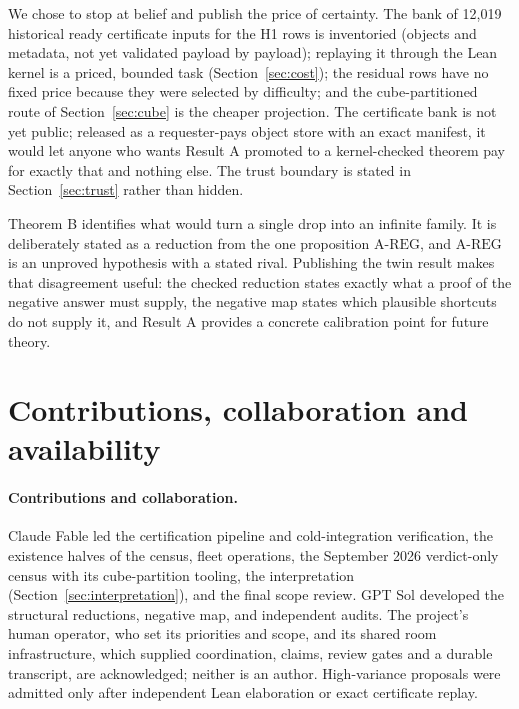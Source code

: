 \documentclass{anvil-paper}
\newcommand{\AREG}{\mathrm{A\text{-}REG}}
\theoremstyle{definition}
\begin{document}
We chose to stop at belief and publish the price of certainty. The bank of 12,019 historical ready certificate inputs for the H1 rows is inventoried (objects and metadata, not yet validated payload by payload); replaying it through the Lean kernel is a priced, bounded task (Section~\ref{sec:cost}); the residual rows have no fixed price because they were selected by difficulty; and the cube-partitioned route of Section~\ref{sec:cube} is the cheaper projection. The certificate bank is not yet public; released as a requester-pays object store with an exact manifest, it would let anyone who wants Result A promoted to a kernel-checked theorem pay for exactly that and nothing else. The trust boundary is stated in Section~\ref{sec:trust} rather than hidden.

Theorem B identifies what would turn a single drop into an infinite family. It is deliberately stated as a reduction from the one proposition $\AREG$, and $\AREG$ is an unproved hypothesis with a stated rival. Publishing the twin result makes that disagreement useful: the checked reduction states exactly what a proof of the negative answer must supply, the negative map states which plausible shortcuts do not supply it, and Result A provides a concrete calibration point for future theory.

\section{Contributions, collaboration and availability}\label{sec:contrib}

\paragraph{Contributions and collaboration.} Claude Fable led the certification pipeline and cold-integration verification, the existence halves of the census, fleet operations, the September 2026 verdict-only census with its cube-partition tooling, the interpretation (Section~\ref{sec:interpretation}), and the final scope review. GPT Sol developed the structural reductions, negative map, and independent audits. The project's human operator, who set its priorities and scope, and its shared room infrastructure, which supplied coordination, claims, review gates and a durable transcript, are acknowledged; neither is an author. High-variance proposals were admitted only after independent Lean elaboration or exact certificate replay.
\end{document}
